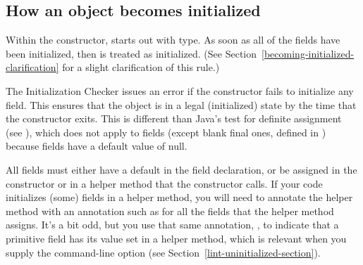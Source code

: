 

\subsection{How an object becomes initialized\label{becoming-initialized}}

Within the constructor,
 starts out with  type.
As soon as all of the  fields
have been initialized, then  is treated as initialized.
(See
Section~\ref{becoming-initialized-clarification} for a slight clarification of
this rule.)

The Initialization Checker issues an error if the constructor fails to initialize
any  field.  This ensures that the object is in a legal (initialized)
state by the time that the constructor exits.
This is different than Java's test for definite assignment (see
),
which does not apply to fields (except blank final ones, defined in
) because fields
have a default value of null.


All  fields must either have a
default in the field declaration, or be assigned in the constructor or in a
helper method that the constructor calls.  If
your code initializes (some) fields in a helper method, you will need to
annotate the helper method with an annotation such as
for all the fields that the helper method assigns.
It's a bit odd, but you use that same annotation, ,
to indicate that a primitive field has its value set in a helper method,
which is relevant when you supply the 
command-line option (see Section~\ref{lint-uninitialized-section}).



